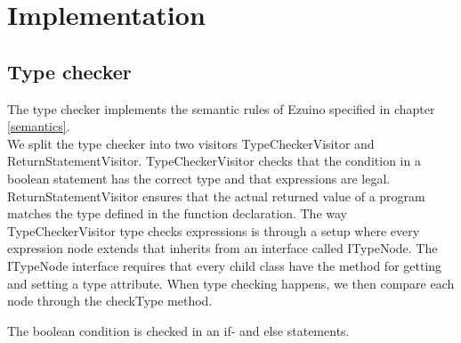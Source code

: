 \chapter{Implementation}
\section{Type checker}
The type checker implements the semantic rules of Ezuino specified in chapter \ref{semantics}. \\
We split the type checker into two visitors TypeCheckerVisitor and ReturnStatementVisitor. TypeCheckerVisitor checks that the condition in a boolean statement has the correct type and that expressions are legal. ReturnStatementVisitor ensures that the actual returned value of a program matches the type defined in the function declaration.
The way TypeCheckerVisitor type checks expressions is through a setup where every expression node extends that inherits from an interface called ITypeNode. The ITypeNode interface requires that every child class have the method for getting and setting a type attribute. When type checking happens, we then compare each node through the checkType method.
\begin{figure}[H]
\centering
{}
\caption{}
\label{dadsa}
\end{figure}

The boolean condition is checked in an if- and else statements.
 \begin{figure}[H]
\centering
{}
\caption{}
\label{lf05}
\end{figure}

